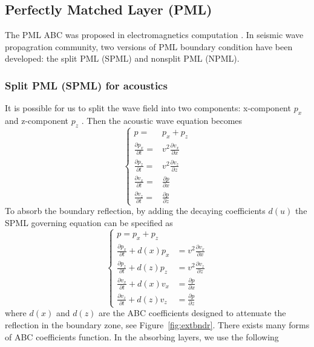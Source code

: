 \subsection{Perfectly Matched Layer (PML)}

The PML ABC was proposed in electromagnetics computation \citep{berenger1994perfectly}. In seismic wave propagration community, two  versions of PML boundary condition have been developed: the split PML (SPML) and nonsplit PML (NPML).

\subsubsection{Split PML (SPML) for acoustics}

It is possible for us to split the wave field into two components: x-component $p_x$ and z-component $p_z$ \citep{carcione2002seismic}. Then the acoustic wave equation becomes 
\begin{equation}\label{eq:spml}
\left\{
\begin{split}
	p=&p_x +p_z\\
	\frac{\partial p_x}{\partial t}=& v^2 \frac{\partial v_x}{\partial x}\\
	\frac{\partial p_z}{\partial t}=& v^2 \frac{\partial v_z}{\partial z}\\
	\frac{\partial v_x}{\partial t}=& \frac{\partial p}{\partial x}\\
	\frac{\partial v_z}{\partial t}=& \frac{\partial p}{\partial z}
\end{split}
\right.
\end{equation}
To absorb the boundary reflection, by adding the decaying coefficients $d(u)$ the SPML governing equation can be specified as \citep{collino2001application}
\begin{equation}\label{eq:spml}
\left\{
\begin{split}
	p=p_x +p_z&\\
	\frac{\partial p_x}{\partial t}+d(x)p_x &= v^2 \frac{\partial v_x}{\partial x}\\
	\frac{\partial p_z}{\partial t}+d(z)p_z &= v^2 \frac{\partial v_z}{\partial z}\\
	\frac{\partial v_x}{\partial t}+d(x)v_x &= \frac{\partial p}{\partial x}\\
	\frac{\partial v_z}{\partial t}+d(z)v_z &= \frac{\partial p}{\partial z}
\end{split}
\right.
\end{equation}
where $d(x)$ and $d(z)$ are the ABC coefficients designed to attenuate the reflection in the boundary zone, see Figure~\ref{fig:extbndr}. There exists many forms of ABC coefficients function. In the absorbing layers, we use the following
